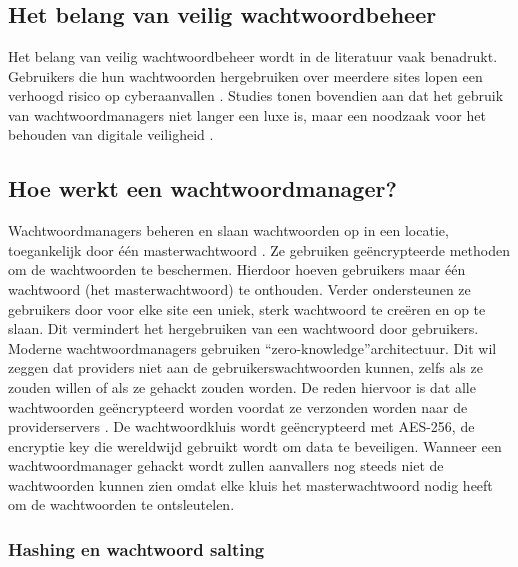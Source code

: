 \chapter{}%
\label{ch:stand-van-zaken}

\section{Het belang van veilig wachtwoordbeheer}

Het belang van veilig wachtwoordbeheer wordt in de literatuur vaak benadrukt. Gebruikers die hun wachtwoorden hergebruiken over meerdere sites lopen een verhoogd risico op cyberaanvallen \autocite{Gaw2006}. Studies tonen bovendien aan dat het gebruik van wachtwoordmanagers niet langer een luxe is, maar een noodzaak voor het behouden van digitale veiligheid \autocite{CMU2025}.

\section{Hoe werkt een wachtwoordmanager?}

Wachtwoordmanagers beheren en slaan wachtwoorden op in een locatie, toegankelijk door één masterwachtwoord \autocite{Alkaldi2019}. Ze gebruiken geëncrypteerde methoden om de wachtwoorden te beschermen. Hierdoor hoeven gebruikers maar één wachtwoord (het masterwachtwoord) te onthouden. Verder ondersteunen ze gebruikers door voor elke site een uniek, sterk wachtwoord te creëren en op te slaan. Dit vermindert het hergebruiken van een wachtwoord door gebruikers.
Moderne wachtwoordmanagers gebruiken ``zero-knowledge''architectuur. Dit wil zeggen dat providers niet aan de gebruikerswachtwoorden kunnen, zelfs als ze zouden willen of als ze gehackt zouden worden. De reden hiervoor is dat alle wachtwoorden geëncrypteerd worden voordat ze verzonden worden naar de providerservers \autocite{RandomKeygen}. De wachtwoordkluis wordt geëncrypteerd met AES-256, de encryptie key die wereldwijd gebruikt wordt om data te beveiligen. Wanneer een wachtwoordmanager gehackt wordt zullen aanvallers nog steeds niet de wachtwoorden kunnen zien omdat elke kluis het masterwachtwoord nodig heeft om de wachtwoorden te ontsleutelen.

\subsection{Hashing en wachtwoord salting}


